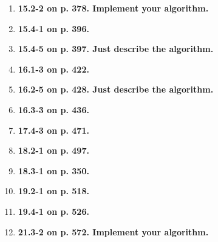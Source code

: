 \documentclass{article}
\begin{document}
\begin{enumerate}
    \item \textbf{15.2-2 on p. 378. Implement your algorithm.}
    \item \textbf{15.4-1 on p. 396.}
    \item \textbf{15.4-5 on p. 397. Just describe the algorithm.}
    \item \textbf{16.1-3 on p. 422.}
    \item \textbf{16.2-5 on p. 428. Just describe the algorithm.}
    \item \textbf{16.3-3 on p. 436.}
    \item \textbf{17.4-3 on p. 471.}
    \item \textbf{18.2-1 on p. 497.}
    \item \textbf{18.3-1 on p. 350.}
    \item \textbf{19.2-1 on p. 518.}
    \item \textbf{19.4-1 on p. 526.}
    \item \textbf{21.3-2 on p. 572. Implement your algorithm.}
  \end{enumerate}
\end{document}
